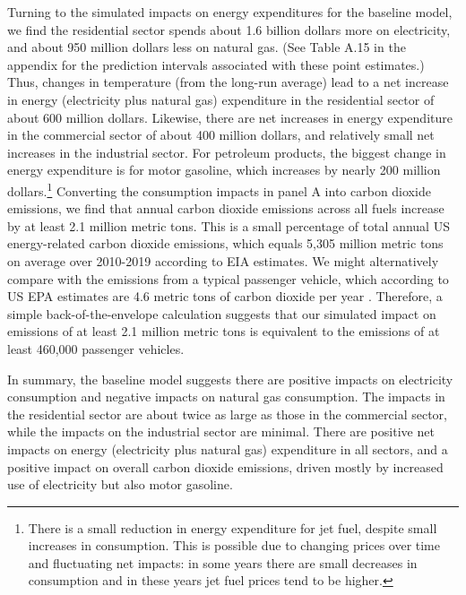 \documentclass[11pt]{article}
\begin{document}
Turning to the simulated impacts on energy expenditures for the baseline model, we find the residential sector spends about 1.6 billion dollars more on electricity, and about 950 million dollars less on natural gas. (See Table A.15 in the appendix for the prediction intervals associated with these point estimates.) Thus, changes in temperature (from the long-run average) lead to a net increase in energy (electricity plus natural gas) expenditure in the residential sector of about 600 million dollars. Likewise, there are net increases in energy expenditure in the commercial sector of about 400 million dollars, and relatively small net increases in the industrial sector. For petroleum products, the biggest change in energy expenditure is for motor gasoline, which increases by nearly 200 million dollars.\footnote{ There is a small reduction in energy expenditure for jet fuel, despite small increases in consumption. This is possible due to changing prices over time and fluctuating net impacts: in some years there are small decreases in consumption and in these years jet fuel prices tend to be higher.} Converting the consumption impacts in panel A into carbon dioxide emissions, we find %
that annual carbon dioxide emissions across all fuels increase by at least 2.1 million metric tons. This is a small percentage of total annual US energy-related carbon dioxide emissions, which equals 5,305 million metric tons on average over 2010-2019 according to EIA estimates. We might alternatively compare with the emissions from a typical passenger vehicle, which according to US EPA estimates are 4.6 metric tons of carbon dioxide per year \citep{EPA2020}. Therefore, a simple back-of-the-envelope calculation suggests that our simulated impact on emissions of at least 2.1 million metric tons is equivalent to the emissions of at least 460,000 passenger vehicles.

In summary, the baseline model suggests there are positive impacts on electricity consumption and negative impacts on natural gas consumption. The impacts in the residential sector are about twice as large as those in the commercial sector, while the impacts on the industrial sector are minimal. There are positive net impacts on energy (electricity plus natural gas) expenditure in all sectors, and a positive impact on overall carbon dioxide emissions, driven mostly by increased use of electricity but also motor gasoline.
\end{document}
